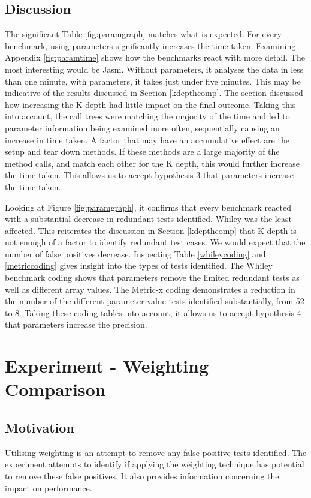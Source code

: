 \subsection{Discussion}
The significant Table \ref{fig:paramgraph} matches what is expected. For every benchmark, using parameters significantly increases the time taken. Examining Appendix \ref{fig:paramtime} shows how the benchmarks react with more detail. The most interesting would be Jasm. Without parameters, it analyses the data in less than one minute, with parameters, it takes just under five minutes. This may be indicative of the results discussed in Section \ref{kdepthcomp}. The section discussed how increasing the K depth had little impact on the final outcome. Taking this into account, the call trees were matching the majority of the time and led to parameter information being examined more often, sequentially causing an increase in time taken. A factor that may have an accumulative effect are the setup and tear down methods. If these methods are a large majority of the method calls, and match each other for the K depth, this would further increase the time taken. This allows us to accept hypothesis 3 that parameters increase the time taken.

Looking at Figure \ref{fig:paramgraph}, it confirms that every benchmark reacted with a substantial decrease in redundant tests identified. Whiley was the least affected. This reiterates the discussion in Section \ref{kdepthcomp} that K depth is not enough of a factor to identify redundant test cases. We would expect that the number of false positives decrease. Inspecting Table \ref{whileycoding} and \ref{metriccoding} gives insight into the types of tests identified. The Whiley benchmark coding shows that parameters remove the limited redundant tests as well as different array values. The Metric-x coding demonstrates a reduction in the number of the different parameter value tests identified substantially, from 52 to 8. Taking these coding tables into account, it allows us to accept hypothesis 4 that parameters increase the precision.

\section{Experiment  - Weighting Comparison}
\label{sec:weight}

\subsection{Motivation}
Utilising weighting is an attempt to remove any false positive tests identified. The experiment attempts to identify if applying the weighting technique has potential to remove these false positives. It also provides information concerning the impact on performance.

